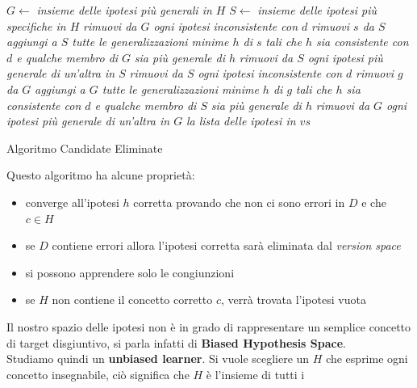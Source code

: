 \documentclass[a4paper,12pt, oneside]{book}
\begin{document}
\begin{algorithm}[H]
  \begin{algorithmic}
    \State $G\gets$ \textit{insieme delle ipotesi più generali in $H$}
    \State $S\gets$ \textit{insieme delle ipotesi più specifiche in $H$}
    \State \textit{rimuovi da $G$ ogni ipotesi inconsistente con $d$}
    \State \textit{rimuovi $s$ da $S$}
    \State
    \State \textit{aggiungi a $S$ tutte le generalizzazioni minime $h$ di $s$}
    \State \textit{tali che $h$ sia consistente con $d$ e qualche membro di $G$}
    \State \textit{sia più generale di $h$}
    \EndFor
    \State \textit{rimuovi da $S$ ogni ipotesi più generale di un'altra in $S$}
    \Else
    \State \textit{rimuovi da $S$ ogni ipotesi inconsistente con $d$}
    \State \textit{rimuovi $g$ da $G$}
    \State
    \State \textit{aggiungi a $G$ tutte le generalizzazioni minime $h$ di $g$}
    \State \textit{tali che $h$ sia consistente con $d$ e qualche membro di $S$}
    \State \textit{sia più generale di $h$}
    \EndFor
    \State \textit{rimuovi da $G$ ogni ipotesi più generale di un'altra in $G$}
    \EndIf
    \EndFor
    \Return \textit{la lista delle ipotesi in $vs$}
    \EndFunction
  \end{algorithmic}
  \caption{Algoritmo Candidate Eliminate}
\end{algorithm}
Questo algoritmo ha alcune proprietà:
\begin{itemize}
  \item converge all'ipotesi $h$ corretta provando che non ci sono errori in $D$
  e che $c\in H$
  \item se $D$ contiene errori allora l'ipotesi corretta sarà eliminata dal
  \textit{version space}
  \item si possono apprendere solo le congiunzioni
  \item se $H$ non contiene il concetto corretto $c$, verrà trovata l'ipotesi
  vuota
\end{itemize}
Il nostro spazio delle ipotesi non è in grado di rappresentare un semplice
concetto di target disgiuntivo, si parla infatti di \textbf{Biased Hypothesis
  Space}. \\
Studiamo quindi un \textbf{unbiased learner}. Si vuole scegliere un $H$ che
esprime ogni concetto insegnabile, ciò significa che $H$ è l'insieme di tutti i
\end{document}
